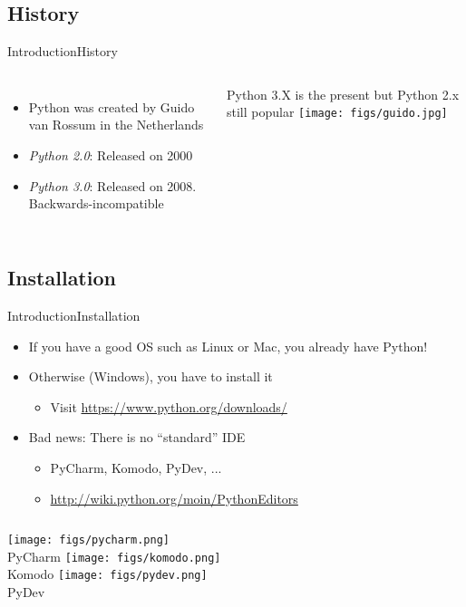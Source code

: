 \documentclass[10pt,compress]{beamer} %
\begin{document}
\subsection{History}
\begin{frame}{Introduction}{History}
    \begin{columns}
			\begin{itemize}
				\item Python was created by Guido van Rossum in the Netherlands
				\item \textit{Python 2.0}: Released on 2000
				\item \textit{Python 3.0}: Released on 2008. Backwards-incompatible
			\end{itemize}
			\bigskip
		\centering Python 3.X is the present but Python 2.x still popular
		\centering \texttt{[image: figs/guido.jpg]}
	\end{columns}
\end{frame}

\subsection{Installation}
\begin{frame}{Introduction}{Installation}
\vspace{-0,3cm}
	\begin{itemize}
		\item If you have a good OS such as Linux or Mac, you already have Python!
		\item Otherwise (Windows), you have to install it
			\begin{itemize}
			\item Visit \url{https://www.python.org/downloads/}
			\end{itemize}
		\item Bad news: There is no ``standard'' IDE
			\begin{itemize}
			\item PyCharm, Komodo, PyDev, ...
			\item \url{http://wiki.python.org/moin/PythonEditors}
			\end{itemize}
	\end{itemize}
    \begin{columns}
		\texttt{[image: figs/pycharm.png]}\\\centering PyCharm
		\texttt{[image: figs/komodo.png]}\\\centering Komodo
		\texttt{[image: figs/pydev.png]}\\\centering PyDev
	\end{columns}
\end{frame}
\end{document}
